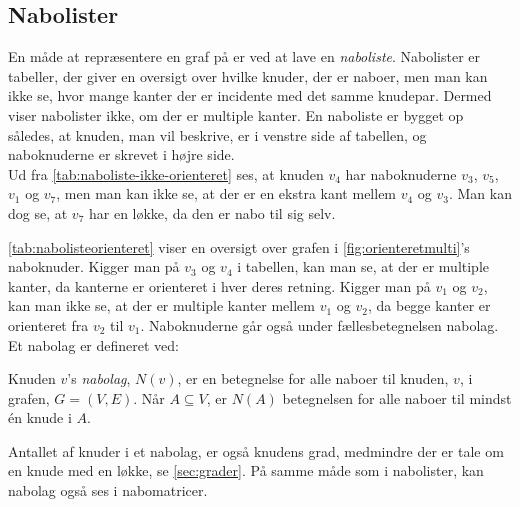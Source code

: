 \subsection{Nabolister}
En måde at repræsentere en graf på er ved at lave en \emph{naboliste}. Nabolister er tabeller, der giver en oversigt over hvilke knuder, der er naboer, men man kan ikke se, hvor mange kanter der er incidente med det samme knudepar. Dermed viser nabolister ikke, om der er multiple kanter. En naboliste er bygget op således, at knuden, man vil beskrive, er i venstre side af tabellen, og naboknuderne er skrevet i højre side. \\




Ud fra \autoref{tab:naboliste-ikke-orienteret} ses, at knuden $v_4$ har naboknuderne $v_3$, $v_5$, $v_1$ og $v_7$, men man kan ikke se, at der er en ekstra kant mellem $v_4$ og $v_3$. Man kan dog se, at $v_7$ har en løkke, da den er nabo til sig selv.


\autoref{tab:nabolisteorienteret} viser en oversigt over grafen i \autoref{fig:orienteretmulti}'s naboknuder. Kigger man på $v_3$ og $v_4$ i tabellen, kan man se, at der er multiple kanter, da kanterne er orienteret i hver deres retning. Kigger man på $v_1$ og $v_2$, kan man ikke se, at der er multiple kanter mellem $v_1$ og $v_2$, da begge kanter er orienteret fra $v_2$ til $v_1$. Naboknuderne går også under fællesbetegnelsen nabolag. Et nabolag er defineret ved:

\begin{defn}[Nabolag] \label{defn:nabolag}
Knuden $v$'s \emph{nabolag}, $N(v)$, er en betegnelse for alle naboer til knuden, $v$, i grafen, $G=(V,E)$. Når $A \subseteq V$, er $N(A)$ betegnelsen for alle naboer til mindst én knude i $A$.
\end{defn}

Antallet af knuder i et nabolag, er også knudens grad, medmindre der er tale om en knude med en løkke, se \autoref{sec:grader}. 
På samme måde som i nabolister, kan nabolag også ses i nabomatricer.